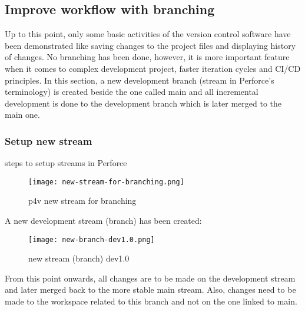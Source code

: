 \subsection{Improve workflow with branching}
Up to this point, only some basic activities of the version control software have been
demonstrated like saving changes to the project files and displaying history of changes. No branching
has been done, however, it is more important feature when it comes to complex development project, faster iteration cycles and
CI/CD principles. In this section, a new development branch (stream in Perforce's terminology) is created beside the one
called main and all incremental development is done to the development branch which is later merged to the main one.
\subsubsection{Setup new stream}
steps to setup streams in Perforce
\begin{figure}[H]
    \centering
    \texttt{[image: new-stream-for-branching.png]}
    \caption{p4v new stream for branching}
    \label{fig:new-stream-for-branching}
\end{figure}
A new development stream (branch) has been created:
\begin{figure}[H]
    \centering
    \texttt{[image: new-branch-dev1.0.png]}
    \caption{new stream (branch) dev1.0}
    \label{fig:new-branch-dev1.0}
\end{figure}
From this point onwards, all changes are to be made on the development stream and later merged back to the more stable
main stream. Also, changes need to be made to the workspace related to this branch and not on the one linked to main.

